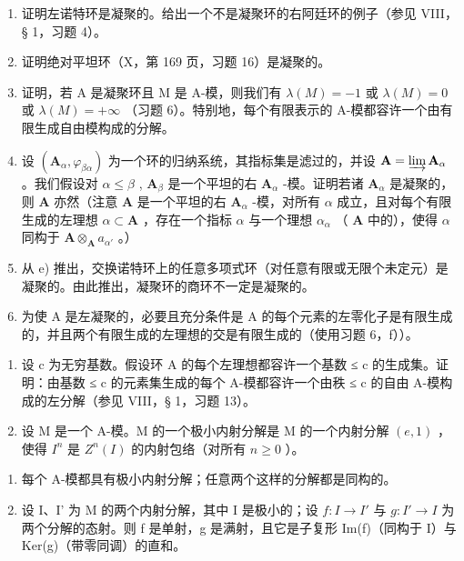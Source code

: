 \begin{enumerate}
\def\labelenumi{\alph{enumi})}
\setcounter{enumi}{1}
\item
  证明左诺特环是凝聚的。给出一个不是凝聚环的右阿廷环的例子（参见 VIII，§ 1，习题 4）。
\item
  证明绝对平坦环（X，第 169 页，习题 16）是凝聚的。
\item
  证明，若 A 是凝聚环且 M 是 A-模，则我们有 \(\lambda(M) = -1\) 或 \(\lambda(M) = 0\) 或 \(\lambda(M) = +\infty\) （习题 6）。特别地，每个有限表示的 A-模都容许一个由有限生成自由模构成的分解。
\item
  设 \((\mathbf{A}_{\alpha}, \varphi_{\beta \alpha})\) 为一个环的归纳系统，其指标集是滤过的，并设 \(\mathbf{A} = \varinjlim \mathbf{A}_{\alpha}\) 。我们假设对 \(\alpha \leqslant \beta\) , \(\mathbf{A}_{\beta}\) 是一个平坦的右 \(\mathbf{A}_{\alpha}\) -模。证明若诸 \(\mathbf{A}_{\alpha}\) 是凝聚的，则 \(\mathbf{A}\) 亦然（注意 \(\mathbf{A}\) 是一个平坦的右 \(\mathbf{A}_{\alpha}\) -模，对所有 \(\alpha\) 成立，且对每个有限生成的左理想 \(\alpha \subset \mathbf{A}\) ，存在一个指标 \(\alpha\) 与一个理想 \(\alpha_{\alpha}\) （ \(\mathbf{A}\) 中的），使得 \(\alpha\) 同构于 \(\mathbf{A} \otimes_{\mathbf{A}} a_{\alpha'}\) 。）
\item
  从 e) 推出，交换诺特环上的任意多项式环（对任意有限或无限个未定元）是凝聚的。由此推出，凝聚环的商环不一定是凝聚的。
\item
  为使 A 是左凝聚的，必要且充分条件是 A 的每个元素的左零化子是有限生成的，并且两个有限生成的左理想的交是有限生成的（使用习题 6，f））。
\end{enumerate}

\begin{enumerate}
\def\labelenumi{\arabic{enumi})}
\setcounter{enumi}{11}
\item
  设 c 为无穷基数。假设环 A 的每个左理想都容许一个基数 ≤ c 的生成集。证明：由基数 ≤ c 的元素集生成的每个 A-模都容许一个由秩 ≤ c 的自由 A-模构成的左分解（参见 VIII，§ 1，习题 13）。
\item
  设 M 是一个 A-模。M 的一个极小内射分解是 M 的一个内射分解 \((e, 1)\) ，使得 \(I^n\) 是 \(Z^n(I)\) 的内射包络（对所有 \(n \geqslant 0\) ）。
\end{enumerate}

\begin{enumerate}
\def\labelenumi{\alph{enumi})}
\tightlist
\item
  每个 A-模都具有极小内射分解；任意两个这样的分解都是同构的。
\item
  设 I、I' 为 M 的两个内射分解，其中 I 是极小的；设 \(f: I \to I'\) 与 \(g: I' \to I\) 为两个分解的态射。则 f 是单射，g 是满射，且它是子复形 Im(f)（同构于 I）与 Ker(g)（带零同调）的直和。
\end{enumerate}

